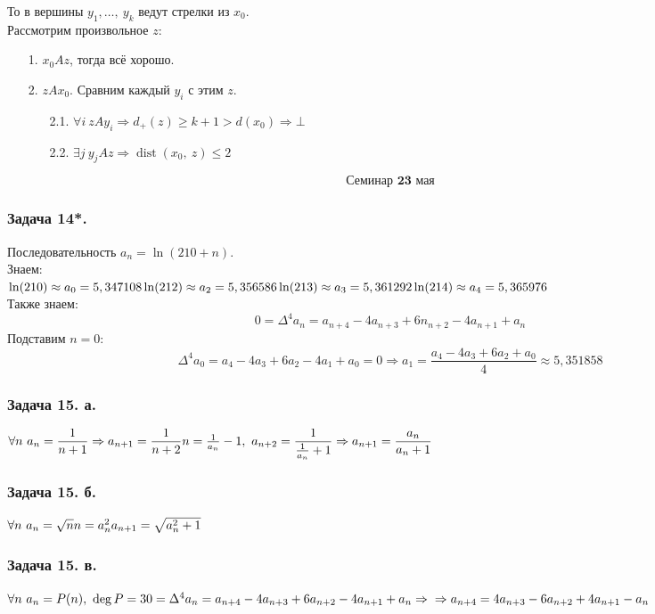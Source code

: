 \documentclass[12pt, letterpaper, twoside]{article}
\begin{document}
    То в вершины $y_1,\dots,\ y_k$ ведут стрелки из $x_0$.\\ 
    Рассмотрим произвольное $z$:
    \begin{enumerate}
        \item[1.] $x_0Az$, тогда всё хорошо.
        \item[2.] $zAx_0$. Сравним каждый $y_i$ с этим $z$.
        \begin{enumerate}
            \item[2.1.] $\forall i\ zAy_i\Rightarrow d_+(z)\geq k+1 > d(x_0)\Rightarrow \bot$
            \item[2.2.] $\exists j\ y_jAz\Rightarrow \operatorname{dist}(x_0,\ z) \leq 2$ 
        \end{enumerate}
    \end{enumerate}

\[\textbf{Семинар 23 мая}\]
    \subsubsection*{Задача 14*.}
    Последовательность $a_n = \ln(210 + n)$.\\
    Знаем:\\
    $\ln(210)\approx a_0 = 5,347108\\
    \ln(212)\approx a_2 = 5,356586\\
    \ln(213)\approx a_3 = 5,361292\\
    \ln(214)\approx a_4 = 5,365976$\\
    Также знаем:
    \[0 = \Delta^4 a_n = a_{n + 4} - 4a_{n + 3} + 6n_{n + 2} - 4 a_{n + 1} + a_n\]
    Подставим $n = 0$:
    \[\Delta^4 a_0 = a_4 - 4a_3 + 6a_2 - 4a_1 + a_0 = 0\Rightarrow a_1 = \frac{a_4 - 4a_3 + 6a_2 + a_0}{4}\approx 5,351858\]
    \subsubsection*{Задача 15. а.}
    $\forall n\ a_n = \dfrac{1}{n + 1}\Rightarrow a_{n + 1} = \dfrac{1}{n + 2}\\
    n = \frac{1}{a_n} - 1,\ a_{n + 2} = \dfrac{1}{\frac{1}{a_n} + 1}\Rightarrow a_{n + 1} = \dfrac{a_n}{a_n + 1}$
    \subsubsection*{Задача 15. б.}
    $\forall n\ a_n = \sqrt{n}\\
    n = a_n^2\\
    a_{n + 1} = \sqrt{a_n^2 + 1}$
    \subsubsection*{Задача 15. в.}
    $\forall n\ a_n = P(n),\ \deg P = 3\\
    0 = \Delta^4 a_n = a_{n + 4} - 4a_{n + 3} + 6a_{n + 2} - 4a_{n + 1} + a_n\Rightarrow\\
    \Rightarrow a_{n + 4} = 4a_{n + 3} - 6a_{n + 2} + 4a_{n + 1} - a_n$
\end{document}
